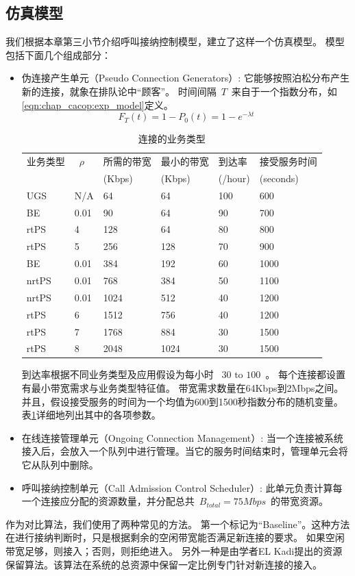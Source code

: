 \subsection{仿真模型}
我们根据本章第三小节介绍呼叫接纳控制模型，建立了这样一个仿真模型。
模型包括下面几个组成部分：
\begin{itemize}
\item 伪连接产生单元（Pseudo Connection Generators）: 它能够按照泊松分布产生新的连接，就象在排队论中“顾客”。
    时间间隔~$T$~来自于一个指数分布，如\eqref{eqn:chap_cacop:exp_model}定义。
%
\begin{equation}
\label{eqn:chap_cacop:exp_model}
F_T(t) = 1 - P_0(t) = 1 - e^{-\lambda t}
\end{equation}
%
\begin{table}[tb]
\caption{连接的业务类型} \label{tb:chap_cacop:sim_cfg}
\begin{center}
\wuhao
\begin{tabularx}{0.99\linewidth}{XXXXXp{2.5cm}}
\toprule
业务类型 &~$\rho$~ &所需的带宽 & 最小的带宽 &到达率 &接受服务时间 \\
&&(Kbps)& (Kbps) & (/hour) &(seconds) \\
\midrule
UGS& N/A &64 &64 & 100 &600\\
BE & 0.01&90 &64 &90 &700\\
rtPS &4& 128 &64 &80 &800\\
rtPS &5& 256 &128 &70 &900\\
BE &0.01& 384 &192 &60 &1000\\
nrtPS &0.01& 768 &384 &50 &1100\\
nrtPS &0.01& 1024 &512 &40 &1200\\
rtPS &6& 1512 &756 &40 &1200\\
rtPS &7& 1768 &884 &30 &1500\\
rtPS &8& 2048 &1024 &30 &1500\\
\bottomrule
\end{tabularx}
\end{center}
\end{table}
到达率根据不同业务类型及应用假设为每小时 ~$30 \text{ to } 100 $~。
每个连接都设置有最小带宽需求与业务类型特征值。
带宽需求数量在64Kbps到2Mbps之间。
并且，假设接受服务的时间为一个均值为600到1500秒指数分布的随机变量。
表\ref{tb:chap_cacop:sim_cfg}详细地列出其中的各项参数。

\item 在线连接管理单元（Ongoing Connection Management）: 当一个连接被系统接入后，会放入一个队列中进行管理。当它的服务时间结束时，管理单元会将它从队列中删除。

\item 呼叫接纳控制单元（Call Admission Control Scheduler）: 此单元负责计算每一个连接应分配的资源数量，并分配总共~$B_{total}=75Mbps$~的带宽资源。 
\end{itemize}
作为对比算法，我们使用了两种常见的方法。
第一个标记为“Baseline”。这种方法在进行接纳判断时，只是根据剩余的空闲带宽能否满足新连接的要求。
如果空闲带宽足够，则接入；否则，则拒绝进入。
另外一种是由学者EL Kadi提出的资源保留算法。该算法在系统的总资源中保留一定比例专门针对新连接的接入\cite{EL-Kadi2002}。
